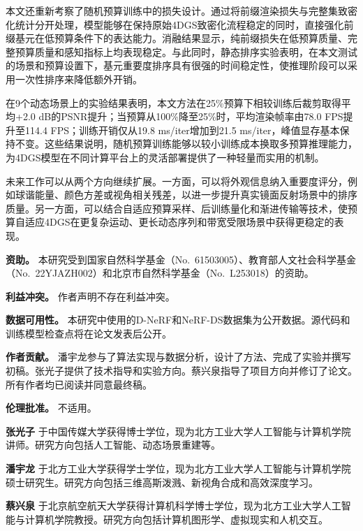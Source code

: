 \documentclass[sn-mathphys]{sn-jnl}
\begin{document}
本文还重新考察了随机预算训练中的损失设计。通过将前缀渲染损失与完整集致密化统计分开处理，模型能够在保持原始4DGS致密化流程稳定的同时，直接强化前缀基元在低预算条件下的表达能力。消融结果显示，纯前缀损失在低预算质量、完整预算质量和感知指标上均表现稳定。与此同时，静态排序实验表明，在本文测试的场景和预算设置下，基元重要度排序具有很强的时间稳定性，使推理阶段可以采用一次性排序来降低额外开销。

在9个动态场景上的实验结果表明，本文方法在25\%预算下相较训练后裁剪取得平均+2.0 dB的PSNR提升；当预算从100\%降至25\%时，平均渲染帧率由78.0 FPS提升至114.4 FPS；训练开销仅从19.8 ms/iter增加到21.5 ms/iter，峰值显存基本保持不变。这些结果说明，随机预算训练能够以较小训练成本换取多预算推理能力，为4DGS模型在不同计算平台上的灵活部署提供了一种轻量而实用的机制。

未来工作可以从两个方向继续扩展。一方面，可以将外观信息纳入重要度评分，例如球谐能量、颜色方差或视角相关残差，以进一步提升真实镜面反射场景中的排序质量。另一方面，可以结合自适应预算采样、后训练量化和渐进传输等技术，使预算自适应4DGS在更复杂运动、更长动态序列和带宽受限场景中获得更稳定的表现。


\textbf{资助。} 本研究受到国家自然科学基金（No.~61503005）、教育部人文社会科学基金（No.~22YJAZH002）和北京市自然科学基金（No.~L253018）的资助。

\textbf{利益冲突。} 作者声明不存在利益冲突。

\textbf{数据可用性。} 本研究中使用的D-NeRF和NeRF-DS数据集为公开数据。源代码和训练模型检查点将在论文发表后公开。

\textbf{作者贡献。} 潘宇龙参与了算法实现与数据分析，设计了方法、完成了实验并撰写初稿。张光子提供了技术指导和实验方向。蔡兴泉指导了项目方向并修订了论文。所有作者均已阅读并同意最终稿。

\textbf{伦理批准。} 不适用。



\textbf{张光子} 
于中国传媒大学获得博士学位，现为北方工业大学人工智能与计算机学院讲师。研究方向包括人工智能、动态场景重建等。


\textbf{潘宇龙} 
于北方工业大学获得学士学位，现为北方工业大学人工智能与计算机学院硕士研究生。研究方向包括三维高斯泼溅、新视角合成和高效深度学习。


\textbf{蔡兴泉} 
于北京航空航天大学获得计算机科学博士学位，现为北方工业大学人工智能与计算机学院教授。研究方向包括计算机图形学、虚拟现实和人机交互。



\end{document}
